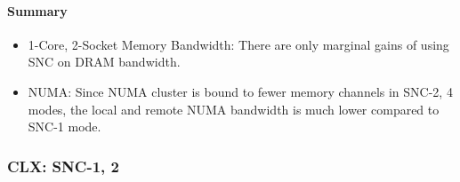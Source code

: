 \documentclass{article}
\begin{document}
\paragraph{Summary}
\begin{itemize}
\item 1-Core, 2-Socket Memory Bandwidth: There are only marginal gains of using SNC on DRAM bandwidth.
\item NUMA: Since NUMA cluster is bound to fewer memory channels in SNC-2, 4 modes, the local and remote NUMA bandwidth is much lower compared to SNC-1 mode.
\end{itemize}
\clearpage
\subsubsection{CLX: SNC-1, 2}
\end{document}
